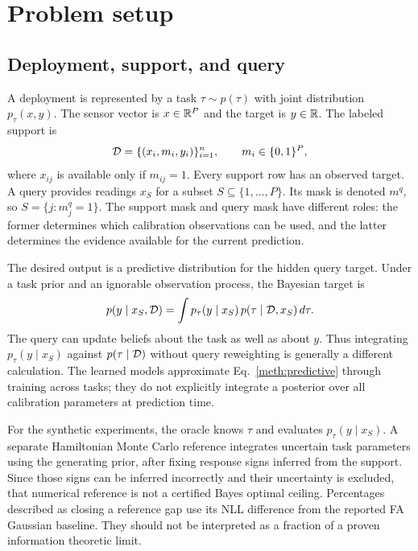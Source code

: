 \section{Problem setup}
\label{sec:setup}

\subsection{Deployment, support, and query}

A deployment is represented by a task $\tau\sim p(\tau)$ with joint distribution $p_\tau(x,y)$. The sensor vector is $x\in\mathbb{R}^P$ and the target is $y\in\mathbb{R}$. The labeled support is
\begin{equation}
  \mathcal{D}=\{(x_i,m_i,y_i)\}_{i=1}^{n},
  \qquad m_i\in\{0,1\}^{P},
  \label{meth:support}
\end{equation}
where $x_{ij}$ is available only if $m_{ij}=1$. Every support row has an observed target. A query provides readings $x_S$ for a subset $S\subseteq\{1,\ldots,P\}$. Its mask is denoted $m^q$, so $S=\{j:m^q_j=1\}$. The support mask and query mask have different roles: the former determines which calibration observations can be used, and the latter determines the evidence available for the current prediction.

The desired output is a predictive distribution for the hidden query target. Under a task prior and an ignorable observation process, the Bayesian target is
\begin{equation}
  p(y\mid x_S,\mathcal{D})
  =\int p_\tau(y\mid x_S)\,p(\tau\mid\mathcal{D},x_S)\,d\tau .
  \label{meth:predictive}
\end{equation}
The query can update beliefs about the task as well as about $y$. Thus integrating $p_\tau(y\mid x_S)$ against $p(\tau\mid\mathcal{D})$ without query reweighting is generally a different calculation. The learned models approximate Eq.~\eqref{meth:predictive} through training across tasks; they do not explicitly integrate a posterior over all calibration parameters at prediction time.

For the synthetic experiments, the oracle knows $\tau$ and evaluates $p_\tau(y\mid x_S)$. A separate Hamiltonian Monte Carlo reference integrates uncertain task parameters using the generating prior, after fixing response signs inferred from the support. Since those signs can be inferred incorrectly and their uncertainty is excluded, that numerical reference is not a certified Bayes optimal ceiling. Percentages described as closing a reference gap use its NLL difference from the reported FA Gaussian baseline. They should not be interpreted as a fraction of a proven information theoretic limit.

